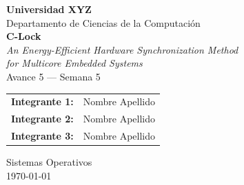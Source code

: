 
\begin{titlepage}
    \centering
    \vspace*{2cm}

    {\Large \textbf{Universidad XYZ}} \\[0.5cm]
    {\large Departamento de Ciencias de la Computación} \\[2cm]

    {\Huge \textbf{C-Lock}} \\[0.4cm]
    {\Large \textit{An Energy-Efficient Hardware Synchronization Method\\for Multicore Embedded Systems}} \\[1cm]
    {\large Avance 5 — Semana 5} \\[2cm]

    \begin{tabular}{ll}
        \textbf{Integrante 1:} & Nombre Apellido \\[0.3cm]
        \textbf{Integrante 2:} & Nombre Apellido \\[0.3cm]
        \textbf{Integrante 3:} & Nombre Apellido \\
    \end{tabular}

    \vfill

    {\large Sistemas Operativos} \\[0.3cm]
    {\large \today}
\end{titlepage}
